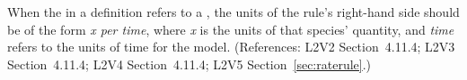 When the  in a \RateRule definition refers to a \Species,
the units of the rule's right-hand side should be of the form \emph{x per
time}, where \emph{x} is the units of that species' quantity, and
\emph{time} refers to the units of time for the model.  (References: L2V2
Section~4.11.4; L2V3 Section~4.11.4; L2V4 Section~4.11.4; L2V5 Section~\ref{sec:raterule}.)
